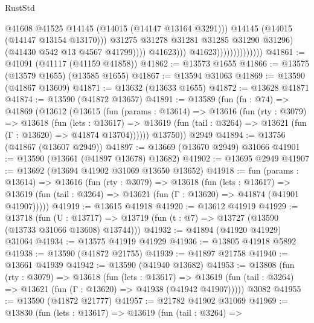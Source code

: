 \begin{lexlean}{RustStd}
\begin{coremodule}
                                                  @41608
                                                  @41525
                                                  @14145
                                                  (@14015 (@14147 @13164 @3291)))
                                                @14145
                                                (@14015 (@14147 @13154 @13170)))
                                              @31275
                                              @31278
                                              @31281
                                              @31285
                                              @31290
                                              @31296)
                                            (@41430 @542 @13 @4567 @41799))))
                                      @41623)))
                                @41623))))))))))))))
@41861 := @41091 (@41117 (@41159 @41858))
@41862 := @13573 @1655
@41866 := @13575 (@13579 @1655) (@13585 @1655)
@41867 := @13594 @31063
@41869 := @13590 (@41867 @13609)
@41871 := @13632 (@13633 @1655)
@41872 := @13628 @41871
@41874 := @13590 (@41872 @13657)
@41891 := @13589
    (fun (fn : @74) =>
    @41869
      (@13612
        (@13615
          (fun (params : @13614) =>
          @13616
            (fun (rty : @3079) =>
            @13618
              (fun (lets : @13617) =>
              @13619 (fun (tail : @3264) => @13621 (fun (Γ : @13620) => @41874 @13704))))))
        @13750))
    @2949
@41894 := @13756 (@41867 (@13607 @2949))
@41897 := @13669 (@13670 @2949) @31066
@41901 := @13590 (@13661 (@41897 @13678) @13682)
@41902 := @13695 @2949
@41907 := @13692 (@13694 @41902 @31069 @13650 @13652)
@41918 := fun (params : @13614) =>
  @13616
    (fun (rty : @3079) =>
    @13618
      (fun (lets : @13617) =>
      @13619 (fun (tail : @3264) => @13621 (fun (Γ : @13620) => @41874 (@41901 @41907)))))
@41919 := @13615 @41918
@41920 := @13612 @41919
@41929 := @13718
    (fun (U : @13717) => @13719 (fun (t : @7) => @13727 (@13590 (@13733 @31066 @13608) @13744)))
@41932 := @41894 (@41920 @41929) @31064
@41934 := @13575 @41919 @41929
@41936 := @13805 @41918 @5892
@41938 := @13590 (@41872 @21755)
@41939 := @41897 @21758
@41940 := @13661 @41939
@41942 := @13590 (@41940 @13682)
@41953 := @13808
    (fun (rty : @3079) =>
    @13618
      (fun (lets : @13617) =>
      @13619 (fun (tail : @3264) => @13621 (fun (Γ : @13620) => @41938 (@41942 @41907)))))
    @3082
@41955 := @13590 (@41872 @21777)
@41957 := @21782 @41902 @31069
@41969 := @13830
    (fun (lets : @13617) =>
    @13619
      (fun (tail : @3264) =>

\end{coremodule}
\end{lexlean}
